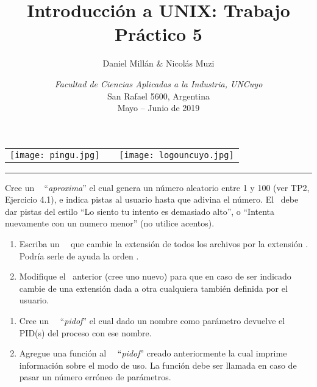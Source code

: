 

\title{Introducción a UNIX: Trabajo Práctico 5}
\author{Daniel Millán \& Nicolás Muzi}
\date{\textit{Facultad de Ciencias Aplicadas a la Industria, UNCuyo}\\ San Rafael 5600, Argentina\\Mayo -- Junio de 2019}    



\begin{tabular}{ccc}
\texttt{[image: pingu.jpg]} &
\begin{minipage}[t!]{0.75\textwidth}
\maketitle
\end{minipage} &
\texttt{[image: logouncuyo.jpg]}\\
\end{tabular}
\hrule
\vspace{5mm}


\begin{ejercicio}
Cree un \script~ ``{\it aproxima}'' el cual genera un número aleatorio entre 1 y 100 (ver TP2, Ejercicio 4.1), e indica pistas al usuario hasta que adivina el número. El \script~debe dar pistas del estilo ``Lo siento tu intento es demasiado alto'', o ``Intenta nuevamente con un numero menor'' (no utilice acentos). 
\end{ejercicio}



\begin{ejercicio}
\begin{enumerate}
\item Escriba un \shell~\script~que cambie la extensión de todos los archivos  por la extensión . Podría serle de ayuda la orden .
\item Modifique el \script~anterior (cree uno nuevo) para que en caso de ser indicado cambie de una extensión dada a otra cualquiera también definida por el usuario.
\end{enumerate}
\end{ejercicio}


\begin{ejercicio}
\begin{enumerate}
 \item Cree un \shell~\script~``{\it pidof}'' el cual dado un nombre como parámetro devuelve el PID(s) del proceso con ese nombre.
 \item Agregue una función  al \shell~\script~``{\it pidof}'' creado anteriormente la cual imprime información sobre el modo de uso. La función debe ser llamada en caso de pasar un número erróneo de parámetros.
 \end{enumerate}
\end{ejercicio}


